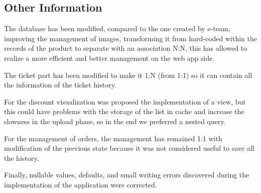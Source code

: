 \subsection{Other Information}


The database has been modified, compared to the one created by e-team, improving the management of images, transforming
it from hard-coded within the records of the product to separate with an association N:N, this has allowed to realize
a more efficient and better management on the web app side.

The ticket part has been modified to make it 1:N (from 1:1) so it can contain all the information of the ticket history.

For the discount visualization was proposed the implementation of a view, but this could have problems with the storage
of the list in cache and increase the slowness in the upload phase, so in the end we preferred a nested query.

For the management of orders, the management has remained 1:1 with modification of the previous state because it was
not considered useful to save all the history.

Finally, nullable values, defaults, and small writing errors discovered during the implementation of the application
were corrected.